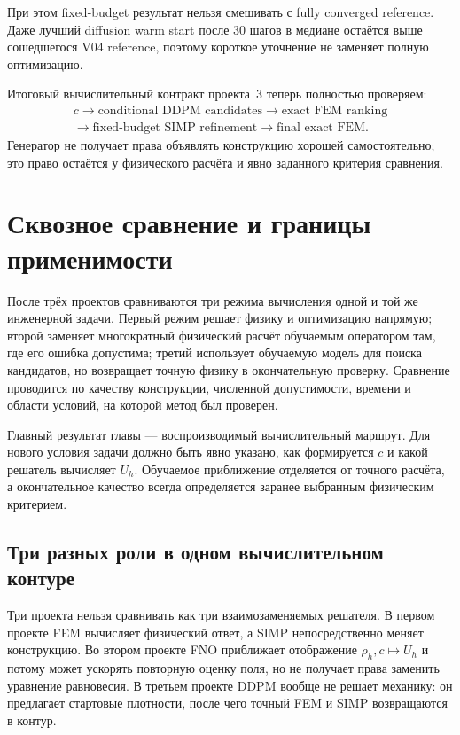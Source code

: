 При этом fixed-budget результат нельзя смешивать с fully converged reference. Даже лучший diffusion warm start после 30 шагов в медиане остаётся выше сошедшегося V04 reference, поэтому короткое уточнение не заменяет полную оптимизацию.

Итоговый вычислительный контракт проекта~3 теперь полностью проверяем:
\begin{equation}
\label{eq:practical-v08-final-pipeline}
 \begin{gathered}
  c
  \longrightarrow
  \text{conditional DDPM candidates}
  \longrightarrow
  \text{exact FEM ranking}
  \\
  \longrightarrow
  \text{fixed-budget SIMP refinement}
  \longrightarrow
  \text{final exact FEM}.
 \end{gathered}
\end{equation}
Генератор не получает права объявлять конструкцию хорошей самостоятельно; это право остаётся у физического расчёта и явно заданного критерия сравнения.

\section{Сквозное сравнение и границы применимости}
\label{sec:practical-cross-project-comparison}

После трёх проектов сравниваются три режима вычисления одной и той же инженерной задачи. Первый режим решает физику и оптимизацию напрямую; второй заменяет многократный физический расчёт обучаемым оператором там, где его ошибка допустима; третий использует обучаемую модель для поиска кандидатов, но возвращает точную физику в окончательную проверку. Сравнение проводится по качеству конструкции, численной допустимости, времени и области условий, на которой метод был проверен.

Главный результат главы --- воспроизводимый вычислительный маршрут. Для нового условия задачи должно быть явно указано, как формируется $c$ и какой решатель вычисляет $U_h$. Обучаемое приближение отделяется от точного расчёта, а окончательное качество всегда определяется заранее выбранным физическим критерием.

\subsection{Три разных роли в одном вычислительном контуре}
\label{subsec:practical-v09-three-roles}

Три проекта нельзя сравнивать как три взаимозаменяемых решателя. В первом проекте FEM вычисляет физический ответ, а SIMP непосредственно меняет конструкцию. Во втором проекте FNO приближает отображение $\rho_h,c\mapsto U_h$ и потому может ускорять повторную оценку поля, но не получает права заменить уравнение равновесия. В третьем проекте DDPM вообще не решает механику: он предлагает стартовые плотности, после чего точный FEM и SIMP возвращаются в контур.

